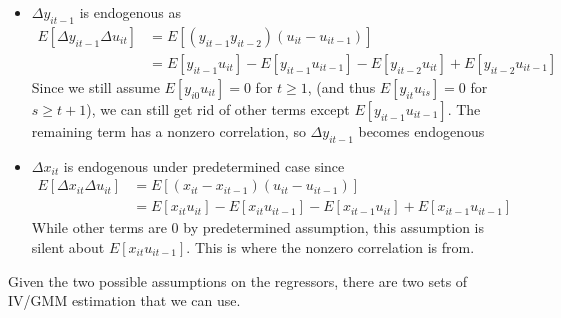 \begin{itemize}
\item $\Delta y_{it-1}$ is endogenous as 
\begin{align*}
E[\Delta y_{it-1}\Delta u_{it}] &= E[(y_{it-1}y_{it-2})(u_{it}-u_{it-1})]\\
&=E[y_{it-1}u_{it}]-E[y_{it-1}u_{it-1}]-E[y_{it-2}u_{it}]+E[y_{it-2}u_{it-1}]
\end{align*}
Since we still assume $E[y_{i0}u_{it}]=0$ for $t\geq1$, (and thus $E[y_{it}u_{is}]=0$ for $s\geq t+1$), we can still get rid of other terms except $E[y_{it-1}u_{it-1}]$. The remaining term has a nonzero correlation, so $\Delta y_{it-1}$ becomes endogenous
\item  $\Delta x_{it}$ is endogenous under predetermined case since
\begin{align*}
E[\Delta x_{it}\Delta u_{it}]&=E[(x_{it}-x_{it-1})(u_{it}-u_{it-1})]\\
&=E[x_{it}u_{it}]-E[x_{it}u_{it-1}]-E[x_{it-1}u_{it}]+E[x_{it-1}u_{it-1}]
\end{align*}
While other terms are 0 by predetermined assumption, this assumption is silent about $E[x_{it}u_{it-1}]$. This is where the nonzero correlation is from. 
\end{itemize}\par
Given the two possible assumptions on the regressors, there are two sets of IV/GMM estimation that we can use.\par
